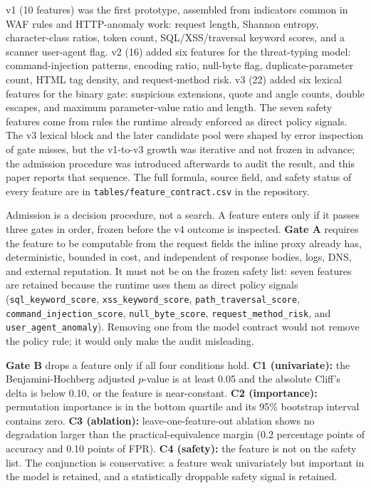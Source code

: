 \documentclass[preprint,11pt]{elsarticle}
\begin{document}
v1 (10 features) was the first prototype, assembled from indicators
common in WAF rules and HTTP-anomaly work: request length, Shannon
entropy, character-class ratios, token count, SQL/XSS/traversal keyword
scores, and a scanner user-agent flag. v2 (16) added six features for
the threat-typing model: command-injection patterns, encoding ratio,
null-byte flag, duplicate-parameter count, HTML tag density, and
request-method risk. v3 (22) added six lexical features for the binary
gate: suspicious extensions, quote and angle counts, double escapes, and
maximum parameter-value ratio and length. The seven safety features come
from rules the runtime already enforced as direct policy signals. The v3
lexical block and the later candidate pool were shaped by error
inspection of gate misses, but the v1-to-v3 growth was iterative and not
frozen in advance; the admission procedure was introduced afterwards to
audit the result, and this paper reports that sequence. The full
formula, source field, and safety status of every feature are in
\texttt{tables/\allowbreak{}feature\_\allowbreak{}contract.\allowbreak{}csv} in the repository.

Admission is a decision procedure, not a search. A feature enters only
if it passes three gates in order, frozen before the v4 outcome is
inspected. \textbf{Gate A} requires the feature to be computable from
the request fields the inline proxy already has, deterministic, bounded
in cost, and independent of response bodies, logs, DNS, and external
reputation. It must not be on the frozen safety list: seven features are
retained because the runtime uses them as direct policy signals
(\texttt{sql\_\allowbreak{}keyword\_\allowbreak{}score}, \texttt{xss\_\allowbreak{}keyword\_\allowbreak{}score},
\texttt{path\_\allowbreak{}traversal\_\allowbreak{}score}, \texttt{command\_\allowbreak{}injection\_\allowbreak{}score},
\texttt{null\_\allowbreak{}byte\_\allowbreak{}score}, \texttt{request\_\allowbreak{}method\_\allowbreak{}risk}, and
\texttt{user\_\allowbreak{}agent\_\allowbreak{}anomaly}). Removing one from the model contract
would not remove the policy rule; it would only make the audit
misleading.

\textbf{Gate B} drops a feature only if all four conditions hold.
\textbf{C1 (univariate):} the Benjamini-Hochberg adjusted \(p\)-value
\citep{benjamini1995controlling} is at least 0.05 and the absolute
Cliff's delta is below 0.10, or the feature is near-constant. \textbf{C2
(importance):} permutation importance is in the bottom quartile and its
95\% bootstrap interval contains zero. \textbf{C3 (ablation):}
leave-one-feature-out ablation shows no degradation larger than the
practical-equivalence margin (0.2 percentage points of accuracy and 0.10
points of FPR). \textbf{C4 (safety):} the feature is not on the safety
list. The conjunction is conservative: a feature weak univariately but
important in the model is retained, and a statistically droppable safety
signal is retained.
\end{document}
